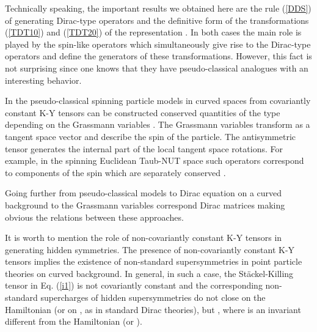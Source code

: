 \documentclass[a4paper,12pt]{article}
\begin{document}
Technically speaking, the important results we obtained here are the 
rule (\ref{DDS}) of generating Dirac-type operators and the definitive form of 
the transformations (\ref{TDT10}) and (\ref{TDT20}) of the representation 
\coordHE{}. In both cases the main role is played by the spin-like 
operators \coordHE{} which simultaneously give rise to the Dirac-type 
operators  and define the generators of these transformations. However, this
fact is not surprising since one knows that they have  pseudo-classical
analogues with an interesting behavior. 


In the pseudo-classical spinning particle models in curved spaces from 
covariantly constant K-Y tensors \coordHE{} can be constructed 
conserved quantities of the type \coordHE{} 
depending on the Grassmann variables \myHighlight{$\{\theta^\mu\}$}\coordHE{} \cite{VV}. 
The Grassmann variables \myHighlight{$\{\theta^\mu\}$}\coordHE{} transform as a tangent space 
vector and describe the spin of the particle. The antisymmetric tensor 
\coordHE{} generates the internal part of the 
local tangent space rotations. For example, in the spinning Euclidean 
Taub-NUT space such operators correspond to components of the spin which 
are separately conserved \cite{JWH}.

Going further from pseudo-classical models to Dirac equation on a curved 
background to the Grassmann variables  correspond Dirac \myHighlight{$\gamma$}\coordHE{} 
matrices making obvious the relations between these approaches.  

It is worth to mention the role of non-covariantly constant K-Y tensors 
in generating hidden symmetries. The presence of non-covariantly 
constant K-Y tensors implies the existence of non-standard 
supersymmetries in point particle theories on curved background. In 
general, in such a case, the St\" ackel-Killing tensor \coordHE{} in 
Eq. (\ref{i1}) is not covariantly constant and the corresponding 
non-standard supercharges \coordHE{} of hidden supersymmetries do not close 
on the Hamiltonian \cite{VV} (or on \coordHE{}, as in standard Dirac theories),
but \coordHE{}, where \coordHE{} is an invariant
different from the Hamiltonian (or \coordHE{}).
\end{document}
